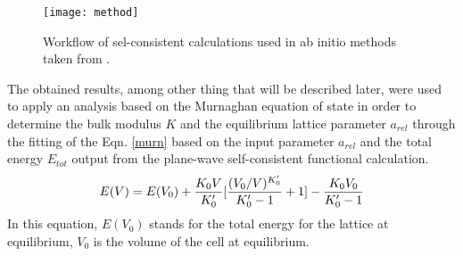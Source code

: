 \documentclass[
	12pt, %
]{fphw}
\begin{document}
\begin{figure}
	\texttt{[image: method]}
	\caption{Workflow of sel-consistent calculations used in ab initio methods taken from \citep{noauthor_notitle_nodate}.}
	\label{method}
\end{figure}
The obtained results, among other thing that will be described later, were used to apply an analysis based on the Murnaghan equation of state in order to determine the bulk modulus $ K$ and the equilibrium lattice parameter $ a_{rel}$ through the fitting of the Eqn. \ref{murn} based on the input parameter $ a_{rel}$ and the total energy $ E_{tot}$ output from the plane-wave self-consistent functional calculation.
\begin{equation}{\label{murn}}
	E(V)=E(V_{0})+ \frac{K_{0}V}{K'_{0}}[ \frac{(V_{0}/V)^{K'_{0}}}{K'_{0}-1} +1]- \frac{K_{0}V_{0}}{K'_{0}-1}
\end{equation}
In this equation, $ E(V_{0})$ stands for the total energy for the lattice at equilibrium, $ V_{0}$ is the volume of the cell at equilibrium.%
\end{document}
